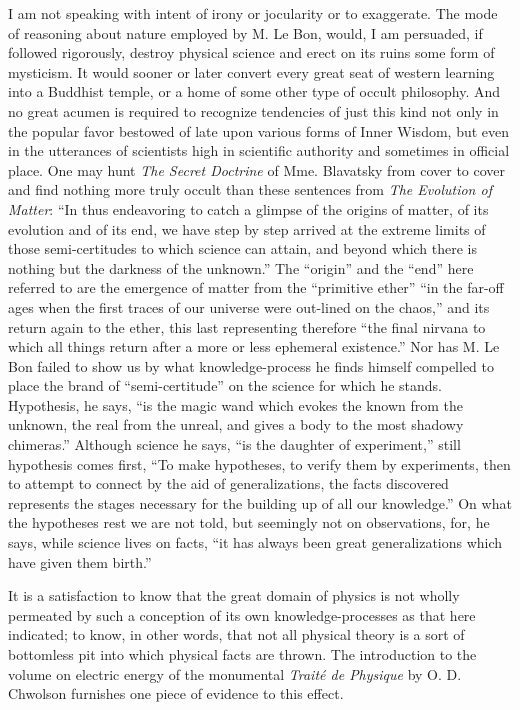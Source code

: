 \documentclass[a4paper, 11pt, oneside, polutonikogreek, english]{article}
\begin{document}
I am not speaking with intent of irony or jocularity or to exaggerate. The mode of reasoning about nature employed by M. Le Bon, would, I am persuaded, if followed rigorously, destroy physical science and erect on its ruins some form of mysticism. It would sooner or later convert every great seat of western learning into a Buddhist temple, or a home of some other type of occult philosophy. And no great acumen is required to recognize tendencies of just this kind not only in the popular favor bestowed of late upon various forms of Inner Wisdom, but even in the utterances of scientists high in scientific authority and sometimes in official place. One may hunt \emph{The Secret Doctrine} of Mme. Blavatsky from cover to cover and find nothing more truly occult than these sentences from \emph{The Evolution of Matter}: ``In thus endeavoring to catch a glimpse of the origins of matter, of its evolution and of its end, we have step by step arrived at the extreme limits of those semi-certitudes to which science can attain, and beyond which there is nothing but the darkness of the unknown.'' The ``origin'' and the ``end'' here referred to are the emergence of matter from the ``primitive ether'' ``in the far-off ages when the first traces of our universe were out-lined on the chaos,'' and its return again to the ether, this last representing therefore ``the final nirvana to which all things return after a more or less ephemeral existence.'' Nor has M. Le Bon failed to show us by what knowledge-process he finds himself compelled to place the brand of ``semi-certitude'' on the science for which he stands. Hypothesis, he says, ``is the magic wand which evokes the known from the unknown, the real from the unreal, and gives a body to the most shadowy chimeras.'' Although science he says, ``is the daughter of experiment,'' still hypothesis comes first, ``To make hypotheses, to verify them by experiments, then to attempt to connect by the aid of generalizations, the facts discovered represents the stages necessary for the building up of all our knowledge.'' On what the hypotheses rest we are not told, but seemingly not on observations, for, he says, while science lives on facts, ``it has always been great generalizations which have given them birth.''

It is a satisfaction to know that the great domain of physics is not wholly permeated by such a conception of its own knowledge-processes as that here indicated; to know, in other words, that not all physical theory is a sort of bottomless pit into which physical facts are thrown. The introduction to the volume on electric energy of the monumental \emph{Traité de Physique} by O. D. Chwolson furnishes one piece of evidence to this effect.
\end{document}
